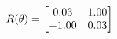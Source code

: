 \documentclass[preview]{standalone}
\begin{document}
\begin{align*}
\special{dvisvgm:raw <g id='unique000'>}R(\theta) = \begin{bmatrix}0.03 & 1.00\\-1.00 & 0.03\end{bmatrix}\special{dvisvgm:raw </g>}
\end{align*}
\end{document}
